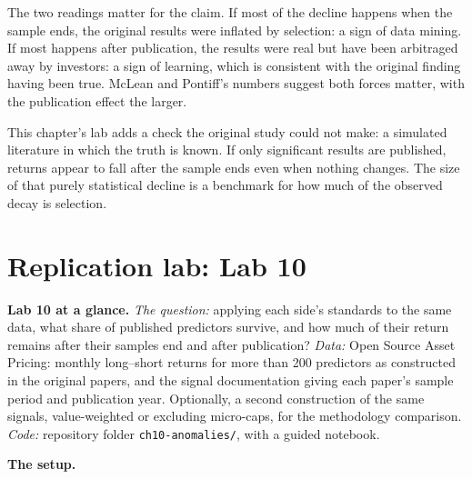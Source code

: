 The two readings matter for the claim. If most of the decline happens when the sample ends, the original results were inflated by selection: a sign of data mining. If most happens after publication, the results were real but have been arbitraged away by investors: a sign of learning, which is consistent with the original finding having been true. McLean and Pontiff's numbers suggest both forces matter, with the publication effect the larger.

This chapter's lab adds a check the original study could not make: a simulated literature in which the truth is known. If only significant results are published, returns appear to fall after the sample ends even when nothing changes. The size of that purely statistical decline is a benchmark for how much of the observed decay is selection.

\section{Replication lab: Lab 10}
\label{sec:10-lab}

\begin{callout}
\textbf{Lab 10 at a glance.} \emph{The question:} applying each side's standards to the same data, what share of published predictors survive, and how much of their return remains after their samples end and after publication? \emph{Data:} Open Source Asset Pricing: monthly long--short returns for more than 200 predictors as constructed in the original papers, and the signal documentation giving each paper's sample period and publication year. Optionally, a second construction of the same signals, value-weighted or excluding micro-caps, for the methodology comparison. \emph{Code:} repository folder \texttt{ch10-anomalies/}, with a guided notebook.
\end{callout}

\textbf{The setup.}

